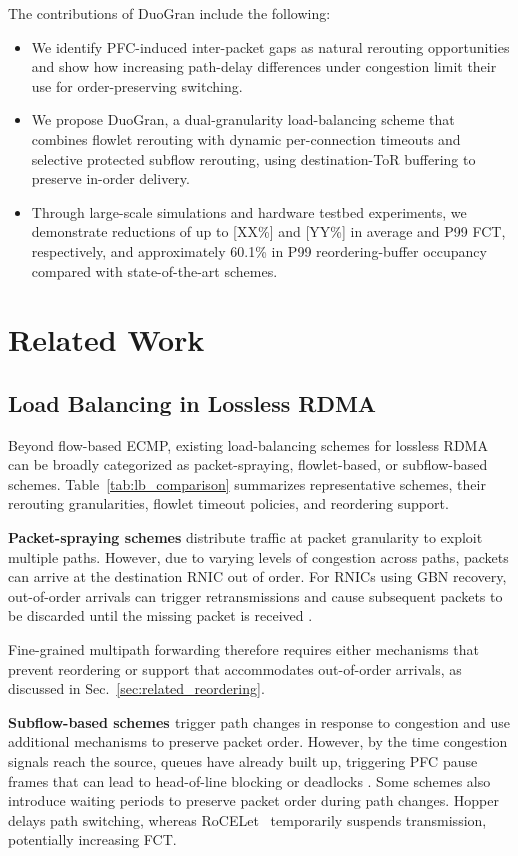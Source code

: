 \documentclass[10pt,journal,compsoc]{IEEEtran}
\begin{document}
The contributions of DuoGran include the following:
\begin{itemize}
    \item We identify PFC-induced inter-packet gaps as natural rerouting opportunities and show how increasing path-delay differences under congestion limit their use for order-preserving switching.
    \item We propose DuoGran, a dual-granularity load-balancing scheme that combines flowlet rerouting with dynamic per-connection timeouts and selective protected subflow rerouting, using destination-ToR buffering to preserve in-order delivery.
    \item Through large-scale simulations and hardware testbed experiments, we demonstrate reductions of up to [XX\%] and [YY\%] in average and P99 FCT, respectively, and approximately 60.1\% in P99 reordering-buffer occupancy compared with state-of-the-art schemes.
\end{itemize}

\section{Related Work}
\subsection{Load Balancing in Lossless RDMA}



\noindent
Beyond flow-based ECMP, existing load-balancing schemes for lossless RDMA can be broadly categorized as packet-spraying, flowlet-based, or subflow-based schemes. Table~\ref{tab:lb_comparison} summarizes representative schemes, their rerouting granularities, flowlet timeout policies, and reordering support.

\noindent
\textbf{Packet-spraying schemes} distribute traffic at packet granularity to exploit multiple paths. However, due to varying levels of congestion across paths, packets can arrive at the destination RNIC out of order. For RNICs using GBN recovery, out-of-order arrivals can trigger retransmissions and cause subsequent packets to be discarded until the missing packet is received \cite{Conweave}. 

Fine-grained multipath forwarding therefore requires either mechanisms that prevent reordering or support that accommodates out-of-order arrivals, as discussed in Sec.~\ref{sec:related_reordering}.

\noindent
\textbf{Subflow-based schemes \cite{Hopper, RoCELet, Reunion}} trigger path changes in response to congestion and use additional mechanisms to preserve packet order. However, by the time congestion signals reach the source, queues have already built up, triggering PFC pause frames that can lead to head-of-line blocking or deadlocks \cite{PFC_bad}. Some schemes also introduce waiting periods to preserve packet order during path changes. Hopper~\cite{Hopper} delays path switching, whereas RoCELet~\cite{RoCELet} temporarily suspends transmission, potentially increasing FCT.
\end{document}
